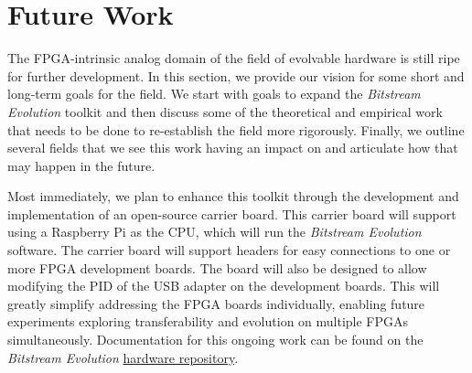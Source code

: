 \documentclass{ieeeaccess}
\begin{document}

\section{Future Work} \label{sec_future_work}

The FPGA-intrinsic analog domain of the field of evolvable hardware is still ripe for further development. In this section, we provide our vision for some short and long-term goals for the field. We start with goals to expand the \textit{Bitstream Evolution} toolkit and then discuss some of the theoretical and empirical work that needs to be done to re-establish the field more rigorously. Finally, we outline several fields that we see this work having an impact on and articulate how that may happen in the future.

Most immediately, we plan to enhance this toolkit through the development and implementation of an open-source carrier board. This carrier board will support using a Raspberry Pi as the CPU, which will run the \textit{Bitstream Evolution} software. The carrier board will support headers for easy connections to one or more FPGA development boards. The board will also be designed to allow modifying the PID of the USB adapter on the development boards. This will greatly simplify addressing the FPGA boards individually, enabling future experiments exploring transferability and evolution on multiple FPGAs simultaneously. Documentation for this ongoing work can be found on the \textit{Bitstream Evolution} \href{https://github.com/evolvablehardware/BitstreamEvolutionHardware}{hardware repository}. %
\end{document}
